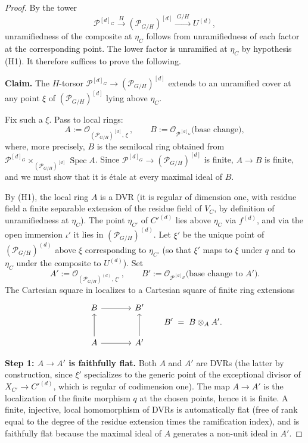 \documentclass[12pt]{amsart}
\newcommand{\cP}{\mathcal{P}}
\theoremstyle{remark}
\begin{document}
\begin{proof}
By the tower
\[
\cP^{[d]_G} \xrightarrow{\;H\;} (\cP_{G/H})^{[d]} \xrightarrow{\;G/H\;} U^{(d)},
\]
unramifiedness of the composite at $\eta_C$ follows from unramifiedness of
each factor at the corresponding point. The lower factor is unramified at
$\eta_C$ by hypothesis (H1). It therefore suffices to prove the following.

\medskip
\noindent\textbf{Claim.} The $H$-torsor
$\cP^{[d]_G} \to (\cP_{G/H})^{[d]}$ extends to an unramified cover at any
point $\xi$ of $(\cP_{G/H})^{[d]}$ lying above $\eta_C$.
\medskip

Fix such a $\xi$. Pass to local rings:
\[
A := \mathcal{O}_{(\cP_{G/H})^{[d]},\,\xi}\,, \qquad
B := \mathcal{O}_{\cP^{[d]_G}}\!\bigl(\text{base change}\bigr),
\]
where, more precisely, $B$ is the semilocal ring obtained from
$\cP^{[d]_G} \times_{(\cP_{G/H})^{[d]}} \operatorname{Spec} A$. Since
$\cP^{[d]_G} \to (\cP_{G/H})^{[d]}$ is finite, $A \to B$ is finite, and we
must show that it is \'etale at every maximal ideal of $B$.

By (H1), the local ring $A$ is a DVR (it is regular of dimension one,
with residue field a finite separable extension of the residue field of
$V_C$, by definition of unramifiedness at $\eta_C$). The point $\eta_{C'}$
of $C'^{(d)}$ lies above $\eta_C$ via $f^{(d)}$, and via the open immersion
$\iota'$ it lies in $(\cP_{G/H})^{(d)}$. Let $\xi'$ be the unique point of
$(\cP_{G/H})^{(d)}$ above $\xi$ corresponding to $\eta_{C'}$ (so that $\xi'$
maps to $\xi$ under $q$ and to $\eta_C$ under the composite to $U^{(d)}$).
Set
\[
A' := \mathcal{O}_{(\cP_{G/H})^{(d)},\,\xi'}\,, \qquad
B' := \mathcal{O}_{\cP^{[d]_H}}\!\bigl(\text{base change to }A'\bigr).
\]
The Cartesian square in  localizes to a
Cartesian square of finite ring extensions
\[
\begin{tikzcd}[row sep=large, column sep=large]
B \ar[r] & B' \\
A \ar[u] \ar[r] & A' \ar[u]
\end{tikzcd}
\qquad B' \;=\; B \otimes_A A'.
\]

\textbf{Step 1: $A \to A'$ is faithfully flat.}
Both $A$ and $A'$ are DVRs (the latter by construction, since $\xi'$
specializes to the generic point of the exceptional divisor of
$X_{C'} \to C'^{(d)}$, which is regular of codimension one). The map
$A \to A'$ is the localization of the finite morphism $q$ at the chosen
points, hence it is finite. A finite, injective, local homomorphism of DVRs
is automatically flat (free of rank equal to the degree of the residue
extension times the ramification index), and is faithfully flat because the
maximal ideal of $A$ generates a non-unit ideal in $A'$.


\end{proof}
\end{document}
